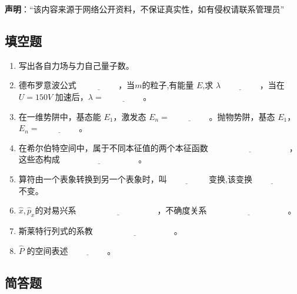 
\textbf{声明}：“该内容来源于网络公开资料，不保证真实性，如有侵权请联系管理员”

\subsection{填空题}
\begin{enumerate}
    \item 写出各自力场与力自己量子数。
    \item 德布罗意波公式 $\underline{\hspace{2cm}}$，当$m$的粒子,有能量 $E$,求 $\lambda\underline{\hspace{2cm}}$，当在 $U = 150V$ 加速后，$\lambda = \underline{\hspace{2cm}}$。
    \item 在一维势阱中，基态能 $E_1$，激发态 $E_n = \underline{\hspace{2cm}}$。抛物势阱，基态 $E_1$，$E_n = \underline{\hspace{2cm}}$。
    \item 在希尔伯特空间中，属于不同本征值的两个本征函数 $\underline{\hspace{4cm}}$，这些态构成$\underline{\hspace{4cm}}$。
    \item 算符由一个表象转换到另一个表象时，叫$\underline{\hspace{2cm}}$ 变换,该变换$\underline{\hspace{2cm}}$ 不变。
    \item $\hat x,\hat p_x$的对易兴系 $\underline{\hspace{4cm}}$，不确度关系 $\underline{\hspace{4cm}}$。
    \item 斯莱特行列式的系教 $\underline{\hspace{4cm}}$。
    \item $\hat P$ 的空间表述$\underline{\hspace{2cm}}$。
\end{enumerate}
\subsection{简答题}
